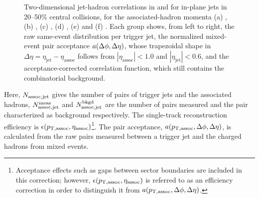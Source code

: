 \begin{figure}
	\caption[Raw, mixed-event and acceptance-corrected jet-hadron correlations for 15--20~GeV/\(c\) jets]{Two-dimensional jet-hadron correlations in \dphi and \deta for in-plane  jets in 20--50\% central \AuAu collisions, for the associated-hadron momenta (a) , (b) , (c) , (d) , (e)  and (f) . Each group shows, from left to right, the raw same-event distribution per trigger jet, the normalized mixed-event pair acceptance $a(\Delta\phi, \Delta\eta)$, whose trapezoidal shape in \(\Delta\eta = \eta_\mathrm{jet} - \eta_\mathrm{assoc}\) follows from \(|\eta_\mathrm{assoc}| < 1.0 \) and \(|\eta_\mathrm{jet}| < 0.6 \), and the acceptance-corrected correlation function, which still contains the combinatorial background.}
	\label{fig:jhcorrjpt1520}
\end{figure}




Here, $N_{\rm assoc, jet}$ gives the number of pairs of trigger jets and the associated hadrons, $N^{\rm meas}_{\rm assoc,jet}$ and $N^{\rm bkgd}_{\rm assoc,jet}$ are the number of pairs measured and the pair characterized as background respectively. The single-track reconstruction efficiency is $\epsilon(p_{\mathrm{T, assoc}}, \eta_{\rm assoc})$\footnote{Acceptance effects such as gaps between sector boundaries are included in this correction; however, $\epsilon(p_{\mathrm{T, assoc}}, \eta_{\rm assoc})$ is referred to as an efficiency correction in order to distinguish it from $a(p_{\mathrm{T, assoc}}, \text{\ensuremath{\Delta\phi}}, \text{\ensuremath{\Delta\eta}})$.}.  The pair acceptance, $a(p_{\mathrm{T, assoc}}, \text{\ensuremath{\Delta\phi}}, \text{\ensuremath{\Delta\eta}})$, is calculated from the raw pairs measured between a trigger jet and the charged hadrons from mixed events.  %

